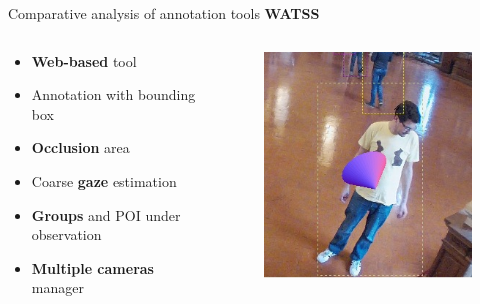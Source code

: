 \documentclass{beamer}
\begin{document}
\begin{tframe}{Comparative analysis of annotation tools}
\textbf{WATSS} 
\begin{columns}[t] %
\begin{column}{.45\textwidth}
\begin{itemize}
\item \textbf{Web-based} tool
\vspace{0.1cm}
\item Annotation with bounding box
\vspace{0.1cm}
\item \textbf{Occlusion} area
\vspace{0.1cm}
\item Coarse \textbf{gaze} estimation
\vspace{0.1cm}
\item \textbf{Groups} and POI under observation
\vspace{0.1cm}
\item \textbf{Multiple cameras} manager
\end{itemize}
\end{column}%
\begin{column}{.3\textwidth}
\begin{figure}[h]
\centering
\includegraphics[scale=0.4]{images/gaze.jpg}
\end{figure}
\end{column}%
\end{columns}
\end{tframe}
\end{document}
